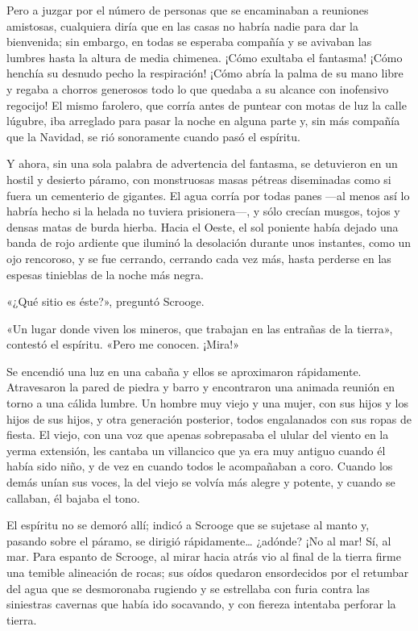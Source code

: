 \documentclass{novela}
\begin{document}
 Pero a juzgar por el número de personas que se encaminaban a reuniones amistosas, cualquiera diría que en las casas no habría nadie para dar la bienvenida; sin embargo, en todas se esperaba compañía y se avivaban las lumbres hasta la altura de media chimenea. ¡Cómo exultaba el fantasma! ¡Cómo henchía su desnudo pecho la respiración! ¡Cómo abría la palma de su mano libre y regaba a chorros generosos todo lo que quedaba a su alcance con inofensivo regocijo! El mismo farolero, que corría antes de puntear con motas de luz la calle lúgubre, iba arreglado para pasar la noche en alguna parte y, sin más compañía que la Navidad, se rió sonoramente cuando pasó el espíritu.

 Y ahora, sin una sola palabra de advertencia del fantasma, se detuvieron en un hostil y desierto páramo, con monstruosas masas pétreas diseminadas como si fuera un cementerio de gigantes. El agua corría por todas panes ---al menos así lo habría hecho si la helada no tuviera prisionera---, y sólo crecían musgos, tojos y densas matas de burda hierba. Hacia el Oeste, el sol poniente había dejado una banda de rojo ardiente que iluminó la desolación durante unos instantes, como un ojo rencoroso, y se fue cerrando, cerrando cada vez más, hasta perderse en las espesas tinieblas de la noche más negra.

 «¿Qué sitio es éste?», preguntó Scrooge.

 «Un lugar donde viven los mineros, que trabajan en las entrañas de la tierra», contestó el espíritu. «Pero me conocen. ¡Mira!»

 Se encendió una luz en una cabaña y ellos se aproximaron rápidamente. Atravesaron la pared de piedra y barro y encontraron una animada reunión en torno a una cálida lumbre. Un hombre muy viejo y una mujer, con sus hijos y los hijos de sus hijos, y otra generación posterior, todos engalanados con sus ropas de fiesta. El viejo, con una voz que apenas sobrepasaba el ulular del viento en la yerma extensión, les cantaba un villancico que ya era muy antiguo cuando él había sido niño, y de vez en cuando todos le acompañaban a coro. Cuando los demás unían sus voces, la del viejo se volvía más alegre y potente, y cuando se callaban, él bajaba el tono.

 El espíritu no se demoró allí; indicó a Scrooge que se sujetase al manto y, pasando sobre el páramo, se dirigió rápidamente{\ldots} ¿adónde? ¡No al mar! Sí, al mar. Para espanto de Scrooge, al mirar hacia atrás vio al final de la tierra firme una temible alineación de rocas; sus oídos quedaron ensordecidos por el retumbar del agua que se desmoronaba rugiendo y se estrellaba con furia contra las siniestras cavernas que había ido socavando, y con fiereza intentaba perforar la tierra.
\end{document}
